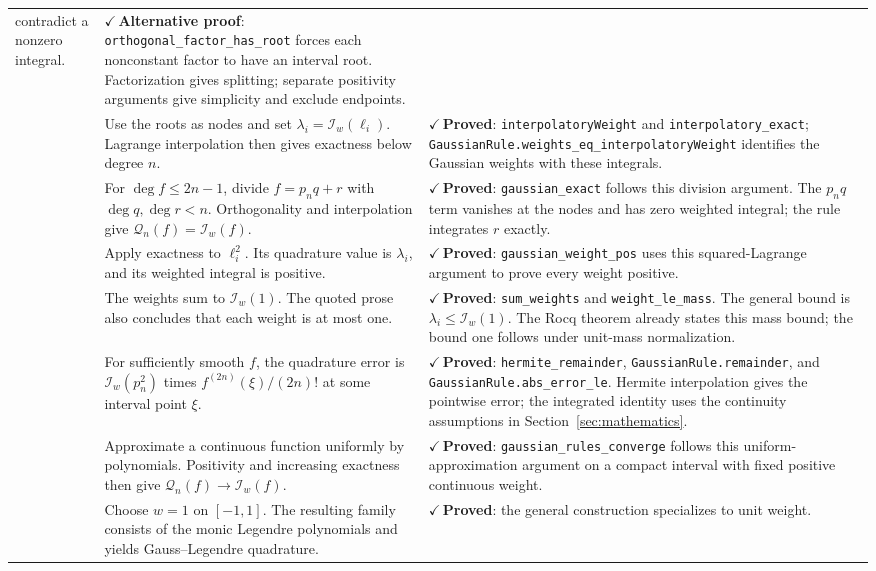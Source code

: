 \documentclass[11pt]{article}
\newcommand{\checked}[1]{\textcolor{provedcolor}{\ensuremath{\checkmark}\,\textbf{#1}}}
\newcommand{\proved}{\checked{Proved}}
\newcommand{\I}{\mathcal{I}}
\newcommand{\Q}{\mathcal{Q}}
\newcommand{\code}[1]{%
  \ifmmode\text{\texttt{\detokenize{#1}}}\else\nolinkurl{#1}\fi}
\begin{document}
\begin{longtable}{@{}>{\raggedright\arraybackslash}p{0.45cm}
  >{\raggedright\arraybackslash}p{6.0cm}
  >{\raggedright\arraybackslash}p{8.75cm}@{}}
contradict a nonzero integral. &
\checked{Alternative proof}: \code{orthogonal_factor_has_root} forces
each nonconstant factor to have an interval root. Factorization gives
splitting; separate positivity arguments give simplicity and exclude endpoints.\\
\addlinespace
15 & Use the roots as nodes and set $\lambda_i=\I_w(\ell_i)$.
Lagrange interpolation then gives exactness below degree $n$. &
\proved{}: \code{interpolatoryWeight} and \code{interpolatory_exact};
\code{GaussianRule.weights_eq_interpolatoryWeight} identifies the
Gaussian weights with these integrals.\\
\addlinespace
16 & For $\deg f\le 2n-1$, divide $f=p_nq+r$ with
$\deg q,\deg r<n$. Orthogonality and interpolation give $\Q_n(f)=\I_w(f)$. &
\proved{}: \code{gaussian_exact} follows this division argument.
The $p_nq$ term vanishes at the nodes and has zero weighted integral;
the rule integrates $r$ exactly.\\
\addlinespace
17 & Apply exactness to $\ell_i^2$. Its quadrature value is
$\lambda_i$, and its weighted integral is positive. &
\proved{}: \code{gaussian_weight_pos} uses this squared-Lagrange
argument to prove every weight positive.\\
\addlinespace
18 & The weights sum to $\I_w(1)$. The quoted prose also concludes that
each weight is at most one. &
\proved{}: \code{sum_weights} and \code{weight_le_mass}.
The general bound is $\lambda_i\le\I_w(1)$.
The Rocq theorem already states this mass bound; the bound one follows
under unit-mass normalization.\\
\addlinespace
19 & For sufficiently smooth $f$, the quadrature error is
$\I_w(p_n^2)$ times $f^{(2n)}(\xi)/(2n)!$ at some interval point $\xi$. &
\proved{}: \code{hermite_remainder}, \code{GaussianRule.remainder},
and \code{GaussianRule.abs_error_le}. Hermite interpolation gives the
pointwise error; the integrated identity uses the continuity assumptions
in Section~\ref{sec:mathematics}.\\
\addlinespace
20 & Approximate a continuous function uniformly by polynomials.
Positivity and increasing exactness then give $\Q_n(f)\to\I_w(f)$. &
\proved{}: \code{gaussian_rules_converge} follows this uniform-approximation
argument on a compact interval with fixed positive continuous weight.\\
\addlinespace
21 & Choose $w=1$ on $[-1,1]$. The resulting family consists of
the monic Legendre polynomials and yields Gauss--Legendre quadrature. &
\proved{}: the general construction specializes to unit weight.

\end{longtable}
\end{document}
